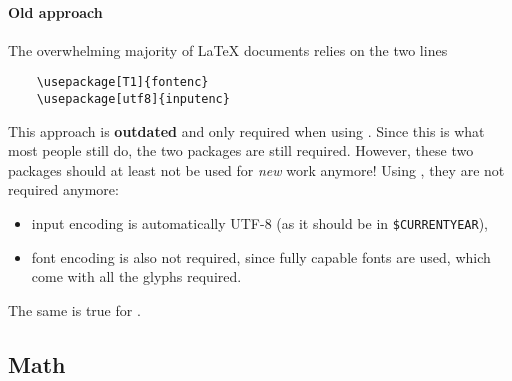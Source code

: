\paragraph{Old approach}
The overwhelming majority of \LaTeX{} documents relies on the two lines
\begin{verbatim}
    \usepackage[T1]{fontenc}
    \usepackage[utf8]{inputenc}
\end{verbatim}
This approach is \textbf{outdated} and only required when using .
Since this is what most people still do, the two packages are still required.
However, these two packages should at least not be used for \emph{new} work anymore!
Using , they are not required anymore:
\begin{itemize}
    \item input encoding is automatically UTF-8 (as it should be in \verb|$CURRENTYEAR|),
    \item font encoding is also not required, since fully capable fonts are used,
          which come with all the glyphs required.
\end{itemize}
The same is true for .

\subsection{Math}
\label{subsec:math}

